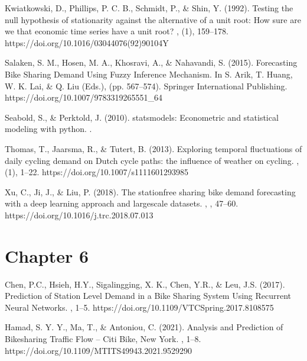 \documentclass[letterpaper,10pt,english]{jupyterBook}
\begin{document}
\sphinxAtStartPar
Kwiatkowski, D., Phillips, P. C. B., Schmidt, P., \& Shin, Y. (1992). Testing the null hypothesis of stationarity against the alternative of a unit root: How sure are we that economic time series have a unit root? , (1), 159–178. https://doi.org/10.1016/0304\sphinxhyphen{}4076(92)90104\sphinxhyphen{}Y

\sphinxAtStartPar
Salaken, S. M., Hosen, M. A., Khosravi, A., \& Nahavandi, S. (2015). Forecasting Bike Sharing Demand Using Fuzzy Inference Mechanism. In S. Arik, T. Huang, W. K. Lai, \& Q. Liu (Eds.),  (pp. 567–574). Springer International Publishing. https://doi.org/10.1007/978\sphinxhyphen{}3\sphinxhyphen{}319\sphinxhyphen{}26555\sphinxhyphen{}1\_64

\sphinxAtStartPar
Seabold, S., \& Perktold, J. (2010). statsmodels: Econometric and statistical modeling with python. .

\sphinxAtStartPar
Thomas, T., Jaarsma, R., \& Tutert, B. (2013). Exploring temporal fluctuations of daily cycling demand on Dutch cycle paths: the influence of weather on cycling. , (1), 1–22. https://doi.org/10.1007/s11116\sphinxhyphen{}012\sphinxhyphen{}9398\sphinxhyphen{}5

\sphinxAtStartPar
Xu, C., Ji, J., \& Liu, P. (2018). The station\sphinxhyphen{}free sharing bike demand forecasting with a deep learning approach and large\sphinxhyphen{}scale datasets. , , 47–60. https://doi.org/10.1016/j.trc.2018.07.013


\section{Chapter 6}
\label{\detokenize{references:chapter-6}}
\sphinxAtStartPar
Chen, P.\sphinxhyphen{}C., Hsieh, H.\sphinxhyphen{}Y., Sigalingging, X. K., Chen, Y.\sphinxhyphen{}R., \& Leu, J.\sphinxhyphen{}S. (2017). Prediction of Station Level Demand in a Bike Sharing System Using Recurrent Neural Networks. , 1–5. https://doi.org/10.1109/VTCSpring.2017.8108575

\sphinxAtStartPar
Hamad, S. Y. Y., Ma, T., \& Antoniou, C. (2021). Analysis and Prediction of Bikesharing Traffic Flow – Citi Bike, New York. , 1–8. https://doi.org/10.1109/MT\sphinxhyphen{}ITS49943.2021.9529290
\end{document}
